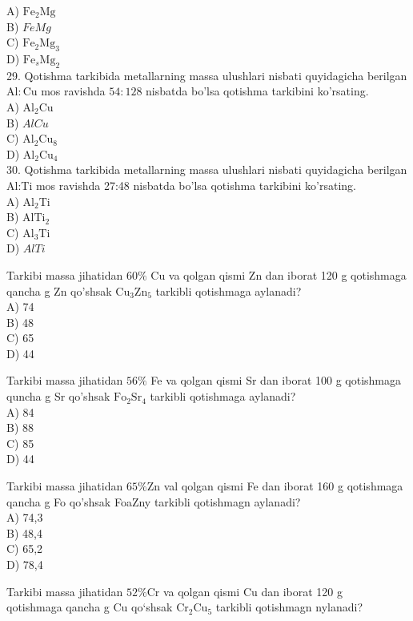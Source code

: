 A) $\mathrm{Fe}_{2} \mathrm{Mg}$\\
B) $FeMg$\\
C) $\mathrm{Fe}_{2} \mathrm{Mg}_{3}$\\
D) $\mathrm{Fe}_{s} \mathrm{Mg}_{2}$\\
29. Qotishma tarkibida metallarning massa ulushlari nisbati quyidagicha berilgan $\mathrm{Al}: \mathrm{Cu}$ mos ravishda $54: 128$ nisbatda bo'lsa qotishma tarkibini ko'rsating.\\
A) $\mathrm{Al}_{2} \mathrm{Cu}$\\
B) $AlCu$\\
C) $\mathrm{Al}_{2} \mathrm{Cu}_{8}$\\
D) $\mathrm{Al}_{2} \mathrm{Cu}_{4}$\\
30. Qotishma tarkibida metallarning massa ulushlari nisbati quyidagicha berilgan Al:Ti mos ravishda 27:48 nisbatda bo'lsa qotishma tarkibini ko'rsating.\\
A) $\mathrm{Al}_{2} \mathrm{Ti}$\\
B) $\mathrm{AlTi}_{2}$\\
C) $\mathrm{Al}_{3} \mathrm{Ti}$\\
D) $AlTi$
  \item Tarkibi massa jihatidan $60 \%$ Cu va qolgan qismi Zn dan iborat 120 g qotishmaga qancha g Zn qo'shsak $\mathrm{Cu}_{3} \mathrm{Zn}_{5}$ tarkibli qotishmaga aylanadi?\\
A) 74\\
B) 48\\
C) 65\\
D) 44
  \item Tarkibi massa jihatidan $56 \%$ Fe va qolgan qismi Sr dan iborat 100 g qotishmaga quncha g Sr qo'shsak $\mathrm{Fo}_{2} \mathrm{Sr}_{4}$ tarkibli qotishmaga aylanadi?\\
A) 84\\
B) 88\\
C) 85\\
D) 44
  \item Tarkibi massa jihatidan $65 \% \mathrm{Zn}$ val qolgan qismi Fe dan iborat 160 g qotishmaga qancha g Fo qo'shsak FoaZny tarkibli qotishmagn aylanadi?\\
A) 74,3\\
B) 48,4\\
C) 65,2\\
D) 78,4
  \item Tarkibi massa jihatidan $52 \% \mathrm{Cr}$ va qolgan qismi Cu dan iborat 120 g\\
qotishmaga qancha g Cu qo`shsak $\mathrm{Cr}_{2} \mathrm{Cu}_{5}$ tarkibli qotishmagn nylanadi?\\
